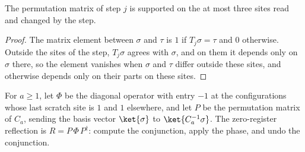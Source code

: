 \begin{lemma}
    \label{lem:zero_register_step_support}
    \leanok
    The permutation matrix of step $j$ is supported on the at most three sites read and changed
    by the step.
\end{lemma}
\begin{proof}\leanok
    The matrix element between $\sigma$ and $\tau$ is $1$ if $T_j\sigma=\tau$ and $0$
    otherwise. Outside the sites of the step, $T_j\sigma$ agrees with $\sigma$, and on them it
    depends only on $\sigma$ there, so the element vanishes when $\sigma$ and $\tau$ differ
    outside these sites, and otherwise depends only on their parts on these sites.
\end{proof}

\begin{definition}
    \label{def:zero_register_reflection}
    \leanok
    For $a\geq1$, let $\Phi$ be the diagonal operator with entry $-1$ at the configurations
    whose last scratch site is $1$ and $1$ elsewhere, and let $P$ be the permutation matrix of
    $C_a$, sending the basis vector $\ket{\sigma}$ to $\ket{C_a^{-1}\sigma}$. The
    zero-register reflection is $R=P\,\Phi\,P^\dagger$: compute the conjunction, apply the
    phase, and undo the conjunction.
\end{definition}

